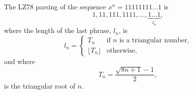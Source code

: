 \documentclass[
  coursecode={MTHE 477},
  assignmentname={Homework \homeworknumber},
  studentnumber=20053722,
  name={Bryan Hoang},
  draft,
]{
  ltxanswer%
}
\begin{document}
  \begin{questions}
    \setcounter{question}{\questionnumber}
    \addtocounter{question}{-1}
    \question[20]\
    \begin{parts}
      \part{}
      \begin{solution}
        The LZ78 parsing of the sequence \(x^{n}=11111111\ldots1\) is
        \begin{equation*}
          \boxed{1,11,111,1111,\dotsc,\underbrace{1\ldots1}_{l_{n}}},
        \end{equation*}
        where the length of the last phrase, \(l_{n}\), is
        \begin{equation*}
          l_{n} = \begin{cases}
            T_{n}                 &\text{if \(n\) is a triangular number,} \\
            \lfloor T_{n} \rfloor &\text{otherwise,}
          \end{cases}
        \end{equation*}
        and where
        \begin{equation*}
          T_{n} = \frac{\sqrt{8n + 1} - 1}{2},
        \end{equation*}
        is the triangular root of \(n\).
      \end{solution}


\end{parts}
\end{questions}
\end{document}
